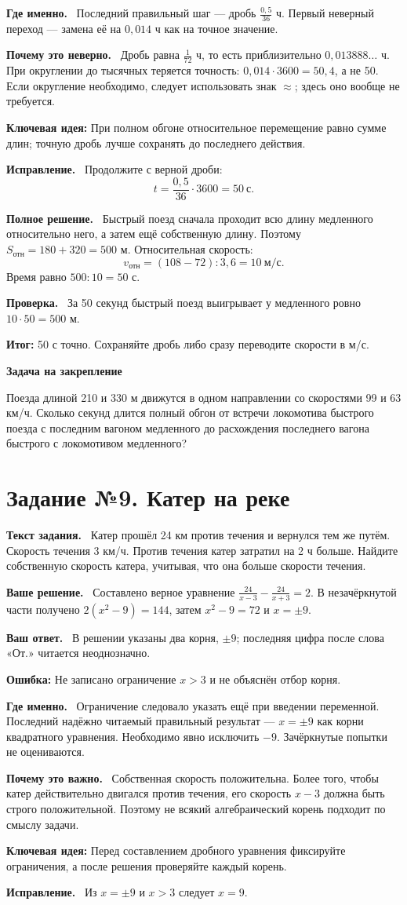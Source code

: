 \documentclass[a4paper,12pt]{article}
\newcommand{\task}[2]{\clearpage\phantomsection\label{task:#1}\section*{\textcolor{darkaccent}{Задание №#1. #2}}}
\newcommand{\parthead}[1]{\par\textbf{#1.}\ }
\newcommand{\error}[1]{\par\textcolor{red!75!black}{\textbf{Ошибка:}} #1\par}
\newcommand{\idea}[1]{\par\textcolor{blue!60!black}{\textbf{Ключевая идея:}} #1\par}
\newcommand{\result}[1]{\par\textcolor{darkaccent}{\textbf{Итог:}} #1\par}
\newcommand{\practice}[1]{\par\medskip\textcolor{accent}{\textbf{Задача на закрепление}}\par #1}
\begin{document}
\parthead{Где именно} Последний правильный шаг --- дробь $\frac{0{,}5}{36}$ ч. Первый неверный переход --- замена её на $0{,}014$ ч как на точное значение.
\parthead{Почему это неверно} Дробь равна $\frac1{72}$ ч, то есть приблизительно $0{,}013888\ldots$ ч. При округлении до тысячных теряется точность: $0{,}014\cdot3600=50{,}4$, а не 50. Если округление необходимо, следует использовать знак $\approx$; здесь оно вообще не требуется.
\idea{При полном обгоне относительное перемещение равно сумме длин; точную дробь лучше сохранять до последнего действия.}
\parthead{Исправление} Продолжите с верной дроби:
\[t=\frac{0{,}5}{36}\cdot3600=50\ \text{с}.\]
\parthead{Полное решение} Быстрый поезд сначала проходит всю длину медленного относительно него, а затем ещё собственную длину. Поэтому $S_{\text{отн}}=180+320=500$ м. Относительная скорость:
\[v_{\text{отн}}=(108-72):3{,}6=10\ \text{м/с}.\]
Время равно $500:10=50$ с.
\parthead{Проверка} За 50 секунд быстрый поезд выигрывает у медленного ровно $10\cdot50=500$ м.
\result{50 с точно. Сохраняйте дробь либо сразу переводите скорости в м/с.}
\practice{Поезда длиной 210 и 330 м движутся в одном направлении со скоростями 99 и 63 км/ч. Сколько секунд длится полный обгон от встречи локомотива быстрого поезда с последним вагоном медленного до расхождения последнего вагона быстрого с локомотивом медленного?}
\task{9}{Катер на реке}
\parthead{Текст задания} Катер прошёл 24 км против течения и вернулся тем же путём. Скорость течения 3 км/ч. Против течения катер затратил на 2 ч больше. Найдите собственную скорость катера, учитывая, что она больше скорости течения.
\parthead{Ваше решение} Составлено верное уравнение $\frac{24}{x-3}-\frac{24}{x+3}=2$. В незачёркнутой части получено $2(x^2-9)=144$, затем $x^2-9=72$ и $x=\pm9$.
\parthead{Ваш ответ} В решении указаны два корня, $\pm9$; последняя цифра после слова «От.» читается неоднозначно.
\error{Не записано ограничение $x>3$ и не объяснён отбор корня.}
\parthead{Где именно} Ограничение следовало указать ещё при введении переменной. Последний надёжно читаемый правильный результат --- $x=\pm9$ как корни квадратного уравнения. Необходимо явно исключить $-9$. Зачёркнутые попытки не оцениваются.
\parthead{Почему это важно} Собственная скорость положительна. Более того, чтобы катер действительно двигался против течения, его скорость $x-3$ должна быть строго положительной. Поэтому не всякий алгебраический корень подходит по смыслу задачи.
\idea{Перед составлением дробного уравнения фиксируйте ограничения, а после решения проверяйте каждый корень.}
\parthead{Исправление} Из $x=\pm9$ и $x>3$ следует $x=9$.
\end{document}
